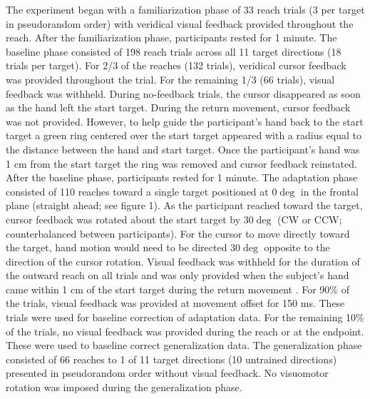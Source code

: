 \documentclass[man, 11pt, longtable, floatsintext, notab]{apa6}
\begin{document}
The experiment began with a familiarization phase of 33
reach trials (3 per target in pseudorandom order) with
veridical visual feedback provided throughout the reach.
After the familiarization phase, participants rested for 1
minute. The baseline phase consisted of 198 reach trials
across all 11 target directions (18 trials per target). For
2/3 of the reaches (132 trials), veridical cursor feedback
was provided throughout the trial. For the remaining 1/3 (66
trials), visual feedback was withheld. During no-feedback
trials, the cursor disappeared as soon as the hand left the
start target. During the return movement, cursor feedback
was not provided. However, to help guide the participant’s
hand back to the start target a green ring centered over the
start target appeared with a radius equal to the distance
between the hand and start target. Once the participant’s
hand was 1 cm from the start target the ring was removed and
cursor feedback reinstated. After the baseline phase,
participants rested for 1 minute. The adaptation phase
consisted of 110 reaches toward a single target positioned
at $0\deg$ in the frontal plane (straight ahead; see figure
1). As the participant reached toward the target, cursor
feedback was rotated about the start target by $30\deg$ (CW
or CCW; counterbalanced between participants). For the
cursor to move directly toward the target, hand motion would
need to be directed $30\deg$ opposite to the direction of
the cursor rotation. Visual feedback was withheld for the
duration of the outward reach on all trials and was only
provided when the subject’s hand came within 1 cm of the
start target during the return movement
\cite{brayanov_motor_2012}. For 90\% of the trials, visual
feedback was provided at movement offset for 150 ms. These
trials were used for baseline correction of adaptation data.
For the remaining 10\% of the trials, no visual feedback was
provided during the reach or at the endpoint. These were
used to baseline correct generalization data. The
generalization phase consisted of 66 reaches to 1 of 11
target directions (10 untrained directions) presented in
pseudorandom order without visual feedback. No visuomotor
rotation was imposed during the generalization phase.
\end{document}
